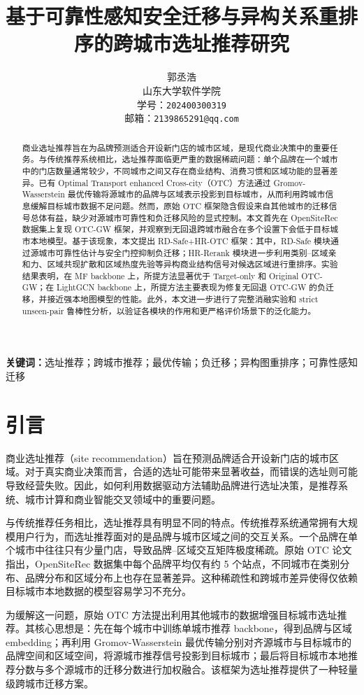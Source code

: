 \documentclass[10pt,twocolumn]{ctexart}
\title{\bfseries 基于可靠性感知安全迁移与异构关系重排序的跨城市选址推荐研究}
\author{
郭丞浩\\
山东大学软件学院\\
学号：\texttt{202400300319}\\
邮箱：\texttt{2139865291@qq.com}
}
\date{}
\begin{document}
\maketitle

\begin{abstract}
商业选址推荐旨在为品牌预测适合开设新门店的城市区域，是现代商业决策中的重要任务。与传统推荐系统相比，选址推荐面临更严重的数据稀疏问题：单个品牌在一个城市中的门店数量通常较少，不同城市之间又存在商业结构、消费习惯和区域功能的显著差异。已有 Optimal Transport enhanced Cross-city（OTC）方法通过 Gromov-Wasserstein 最优传输将源城市的品牌与区域表示投影到目标城市，从而利用跨城市信息缓解目标城市数据不足问题。然而，原始 OTC 框架隐含假设来自其他城市的迁移信号总体有益，缺少对源城市可靠性和负迁移风险的显式控制。本文首先在 OpenSiteRec 数据集上复现 OTC-GW 框架，并观察到无回退跨城市融合在多个设置下会低于目标城市本地模型。基于该现象，本文提出 RD-Safe+HR-OTC 框架：其中，RD-Safe 模块通过源城市可靠性估计与安全门控抑制负迁移；HR-Rerank 模块进一步利用类别--区域亲和力、区域共现扩散和区域热度先验等异构商业结构信号对候选区域进行重排序。实验结果表明，在 MF backbone 上，所提方法显著优于 Target-only 和 Original OTC-GW；在 LightGCN backbone 上，所提方法主要表现为修复无回退 OTC-GW 的负迁移，并接近强本地图模型的性能。此外，本文进一步进行了完整消融实验和 strict unseen-pair 鲁棒性分析，以验证各模块的作用和更严格评价场景下的泛化能力。
\end{abstract}

\noindent\textbf{关键词：}选址推荐；跨城市推荐；最优传输；负迁移；异构图重排序；可靠性感知迁移

\section{引言}

商业选址推荐（site recommendation）旨在预测品牌适合开设新门店的城市区域。对于真实商业决策而言，合适的选址可能带来显著收益，而错误的选址则可能导致经营失败。因此，如何利用数据驱动方法辅助品牌进行选址决策，是推荐系统、城市计算和商业智能交叉领域中的重要问题。

与传统推荐任务相比，选址推荐具有明显不同的特点。传统推荐系统通常拥有大规模用户行为，而选址推荐面对的是品牌与城市区域之间的交互关系。一个品牌在单个城市中往往只有少量门店，导致品牌--区域交互矩阵极度稀疏。原始 OTC 论文指出，OpenSiteRec 数据集中每个品牌平均仅有约 5 个站点，不同城市在类别分布、品牌分布和区域分布上也存在显著差异。这种稀疏性和跨城市差异使得仅依赖目标城市本地数据的模型容易学习不充分。

为缓解这一问题，原始 OTC 方法提出利用其他城市的数据增强目标城市选址推荐。其核心思想是：先在每个城市中训练单城市推荐 backbone，得到品牌与区域 embedding；再利用 Gromov-Wasserstein 最优传输分别对齐源城市与目标城市的品牌空间和区域空间，将源城市推荐信号投影到目标城市；最后将目标城市本地推荐分数与多个源城市的迁移分数进行加权融合。该框架为选址推荐提供了一种轻量级跨城市迁移方案。
\end{document}
